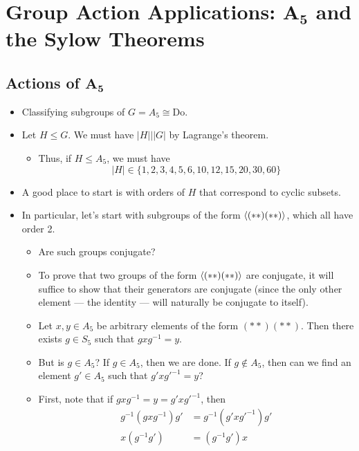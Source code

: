\documentclass[../notes.tex]{subfiles}
\begin{document}
\chapter[Group Action Applications: \texorpdfstring{$A_5$}{TEXT} and the Sylow Theorems]{Group Action Applications: \texorpdfstring{$\bm{A_5}$}{TEXT} and the Sylow Theorems}
\section[Actions of \texorpdfstring{$A_5$}{TEXT}]{Actions of \texorpdfstring{$\bm{A_5}$}{TEXT}}
\begin{itemize}
    \item {}Classifying subgroups of $G=A_5\cong\text{Do}$.
    \item Let $H\leq G$. We must have $|H|\big||G|$ by Lagrange's theorem.
    \begin{itemize}
        \item Thus, if $H\leq A_5$, we must have
        \begin{equation*}
            |H| \in \{1,2,3,4,5,6,10,12,15,20,30,60\}
        \end{equation*}
    \end{itemize}
    \item A good place to start is with orders of $H$ that correspond to cyclic subsets.
    \item In particular, let's start with subgroups of the form $\left\langle{(**)(**)}\right\rangle$, which all have order 2.
    \begin{itemize}
        \item Are such groups conjugate?
        \item To prove that two groups of the form $\left\langle{(**)(**)}\right\rangle$ are conjugate, it will suffice to show that their generators are conjugate (since the only other element --- the identity --- will naturally be conjugate to itself).
        \item Let $x,y\in A_5$ be arbitrary elements of the form $(**)(**)$. Then there exists $g\in S_5$ such that $gxg^{-1}=y$.
        \item But is $g\in A_5$? If $g\in A_5$, then we are done. If $g\notin A_5$, then can we find an element $g'\in A_5$ such that $g'xg'^{-1}=y$?
        \item First, note that if $gxg^{-1}=y=g'xg'^{-1}$, then
        \begin{align*}
            g^{-1}(gxg^{-1})g' &= g^{-1}(g'xg'^{-1})g'\\
            x(g^{-1}g') &= (g^{-1}g')x

\end{align*}
\end{itemize}
\end{itemize}
\end{document}
